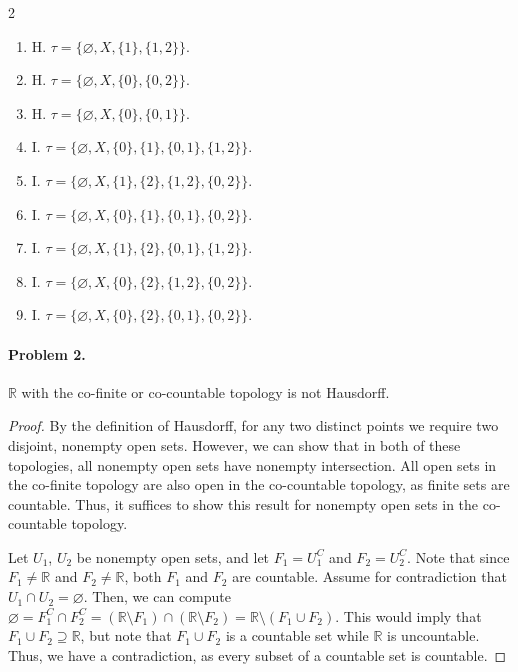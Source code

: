 \documentclass[12pt]{article}
\begin{document}
\begin{multicols}{2}
\begin{enumerate}
    \item H. $\tau = \{\varnothing, X, \{1\}, \{1, 2\}\}$.
    \item H. $\tau = \{\varnothing, X, \{0\}, \{0, 2\}\}$.
    \item H. $\tau = \{\varnothing, X, \{0\}, \{0, 1\}\}$.
    \item I. $\tau = \{\varnothing, X, \{0\}, \{1\}, \{0, 1\}, \{1, 2\} \}$.
    \item I. $\tau = \{\varnothing, X, \{1\}, \{2\}, \{1, 2\}, \{0, 2\}\}$.
    \item I. $\tau = \{\varnothing, X, \{0\}, \{1\}, \{0, 1\}, \{0, 2\}\}$.
    \item I. $\tau = \{\varnothing, X, \{1\}, \{2\}, \{0, 1\}, \{1, 2\} \}$.
    \item I. $\tau = \{\varnothing, X, \{0\}, \{2\}, \{1, 2\}, \{0, 2\}\}$.
    \item I. $\tau = \{\varnothing, X, \{0\}, \{2\}, \{0, 1\}, \{0, 2\}\}$.
\end{enumerate}
\end{multicols}

\newpage{}
\paragraph{Problem 2.} $\mathbb R$ with the co-finite or co-countable topology is not Hausdorff.

\begin{proof}
    By the definition of Hausdorff, for any two distinct points we require two disjoint, nonempty open sets. However, we can show that in both of these topologies, all nonempty open sets have nonempty intersection. All open sets in the co-finite topology are also open in the co-countable topology, as finite sets are countable. Thus, it suffices to show this result for nonempty open sets in the co-countable topology.

    Let $U_1$, $U_2$ be nonempty open sets, and let $F_1 = U_1^C$ and $F_2 = U_2^C$. Note that since $F_1 \neq \mathbb R$ and $F_2 \neq \mathbb R$, both $F_1$ and $F_2$ are countable. Assume for contradiction that $U_1 \cap U_2 = \varnothing$. Then, we can compute $\varnothing = F_1^C \cap F_2^C = (\mathbb R \setminus F_1) \cap (\mathbb R \setminus F_2) = \mathbb R \setminus (F_1 \cup F_2)$. This would imply that $F_1 \cup F_2 \supseteq \mathbb R$, but note that $F_1 \cup F_2$ is a countable set while $\mathbb R$ is uncountable. Thus, we have a contradiction, as every subset of a countable set is countable.
\end{proof}
\end{document}
